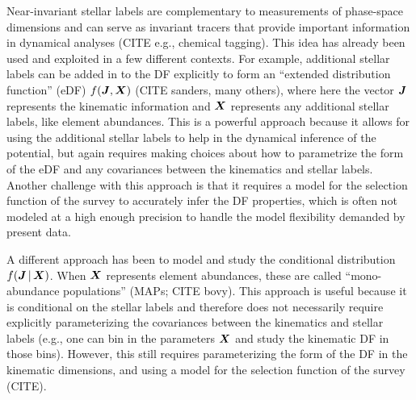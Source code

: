 

Near-invariant stellar labels are complementary to measurements of phase-space
dimensions and can serve as invariant tracers that provide important information in
dynamical analyses (CITE e.g., chemical tagging).
This idea has already been used and exploited in a few different contexts.
For example, additional stellar labels can be added in to the DF explicitly to form an
``extended distribution function'' (eDF) $f(\boldsymbol{J}, \boldsymbol{X})$ (CITE sanders, many
others), where here the vector $\boldsymbol{J}$ represents the kinematic information and
$\boldsymbol{X}$ represents any additional stellar labels, like element abundances.
This is a powerful approach because it allows for using the additional stellar labels to
help in the dynamical inference of the potential, but again requires making choices
about how to parametrize the form of the eDF and any covariances between the kinematics
and stellar labels.
Another challenge with this approach is that it requires a model for the selection
function of the survey to accurately infer the DF properties, which is often not modeled
at a high enough precision to handle the model flexibility demanded by present data.

A different approach has been to model and study the conditional distribution $f(\boldsymbol{J}
\,|\, \boldsymbol{X})$.
When $\boldsymbol{X}$ represents element abundances, these are called ``mono-abundance
populations'' (MAPs; CITE bovy).
This approach is useful because it is conditional on the stellar labels and therefore
does not necessarily require explicitly parameterizing the covariances between the
kinematics and stellar labels (e.g., one can bin in the parameters $\boldsymbol{X}$ and study
the kinematic DF in those bins).
However, this still requires parameterizing the form of the DF in the kinematic
dimensions, and using a model for the selection function of the survey (CITE).

